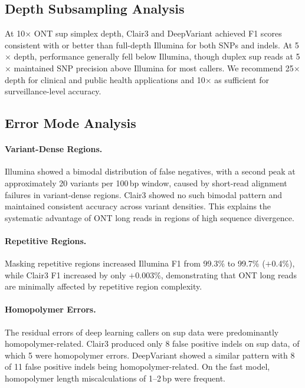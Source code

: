 \documentclass[11pt]{article}
\begin{document}
\subsection{Depth Subsampling Analysis}

At 10$\times$ ONT sup simplex depth, Clair3 and DeepVariant achieved F1 scores consistent with or better than full-depth Illumina for both SNPs and indels. At 5$\times$ depth, performance generally fell below Illumina, though duplex sup reads at 5$\times$ maintained SNP precision above Illumina for most callers. We recommend 25$\times$ depth for clinical and public health applications and 10$\times$ as sufficient for surveillance-level accuracy.

\subsection{Error Mode Analysis}

\paragraph{Variant-Dense Regions.} Illumina showed a bimodal distribution of false negatives, with a second peak at approximately 20 variants per 100\,bp window, caused by short-read alignment failures in variant-dense regions. Clair3 showed no such bimodal pattern and maintained consistent accuracy across variant densities. This explains the systematic advantage of ONT long reads in regions of high sequence divergence.

\paragraph{Repetitive Regions.} Masking repetitive regions increased Illumina F1 from 99.3\% to 99.7\% ($+$0.4\%), while Clair3 F1 increased by only $+$0.003\%, demonstrating that ONT long reads are minimally affected by repetitive region complexity.

\paragraph{Homopolymer Errors.} The residual errors of deep learning callers on sup data were predominantly homopolymer-related. Clair3 produced only 8 false positive indels on sup data, of which 5 were homopolymer errors. DeepVariant showed a similar pattern with 8 of 11 false positive indels being homopolymer-related. On the fast model, homopolymer length miscalculations of 1--2\,bp were frequent.
\end{document}
